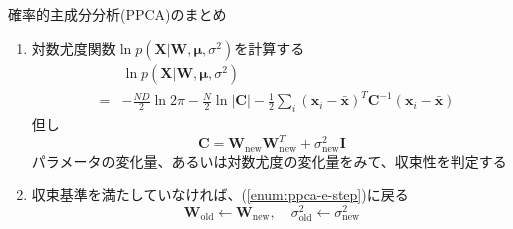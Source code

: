 \documentclass[dvipdfmx,notheorems,t]{beamer}
\begin{document}
\begin{frame}{確率的主成分分析(PPCA)のまとめ}
\begin{enumerate}
	\item 対数尤度関数$\ln p(\bm{X} | \bm{W}, \bm{\mu}, \sigma^2)$を計算する
	\begin{eqnarray}
		&& \ln p(\bm{X} | \bm{W}, \bm{\mu}, \sigma^2) \nonumber \\
		&=& -\frac{ND}{2} \ln 2\pi - \frac{N}{2} \ln |\bm{C}| - \frac{1}{2} \sum_i \left( \bm{x}_i - \bar{\bm{x}} \right)^T \bm{C}^{-1} \left( \bm{x}_i - \bar{\bm{x}} \right) \nonumber
	\end{eqnarray}
	但し
	\begin{equation}
		\bm{C} = \bm{W}_\mathrm{new} \bm{W}_\mathrm{new}^T + \sigma^2_\mathrm{new} \bm{I}
	\end{equation}
	パラメータの変化量、あるいは対数尤度の変化量をみて、収束性を判定する
	\newline
	
	\item 収束基準を満たしていなければ、(\ref{enum:ppca-e-step})に戻る
	\begin{equation}
		\bm{W}_\mathrm{old} \leftarrow \bm{W}_\mathrm{new}, \quad \sigma^2_\mathrm{old} \leftarrow \sigma^2_\mathrm{new}
	\end{equation}
\end{enumerate}

\end{frame}
\end{document}
